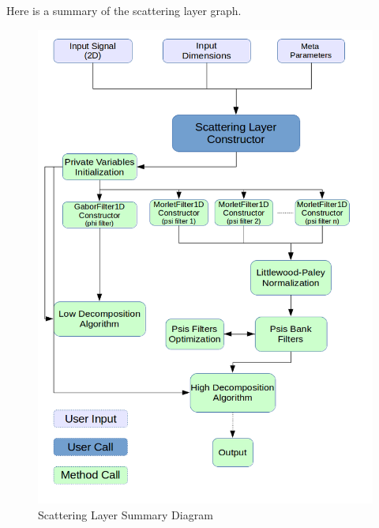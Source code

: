 \documentclass[a4paper]{report}
\begin{document}
Here is a summary of the scattering layer graph.
\begin{figure}[H]
\begin{center}
\includegraphics[scale=0.40]{layer_diagram.png}\caption{Scattering Layer Summary Diagram}
\end{center}
\end{figure}
\end{document}
